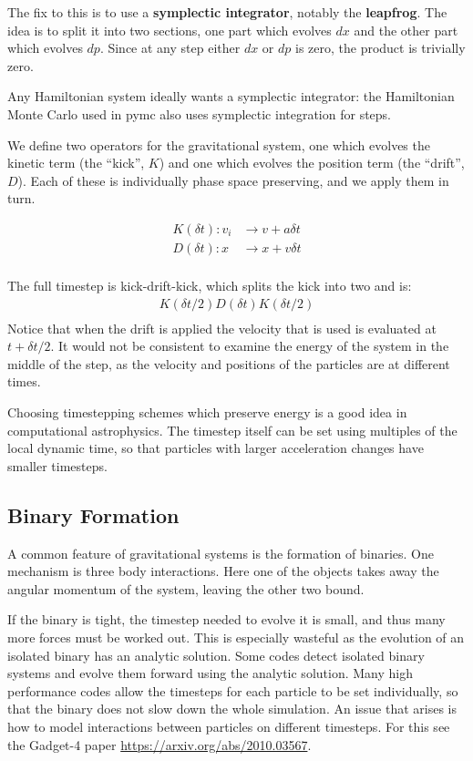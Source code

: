 \documentclass[12pt]{article}
\begin{document}
The fix to this is to use a \textbf{symplectic integrator}, notably the \textbf{leapfrog}. The idea is to split it into two sections, one part which evolves $dx$ and the other part which evolves $dp$. Since at any step either $dx$ or $dp$ is zero, the product is trivially zero.

Any Hamiltonian system ideally wants a symplectic integrator: the Hamiltonian Monte Carlo used in pymc also uses symplectic integration for steps.

We define two operators for the gravitational system, one which evolves the kinetic term (the ``kick'', $K$) and one which evolves the position term (the ``drift'', $D$). Each of these is individually phase space preserving, and we apply them in turn.

\begin{align}
 K(\delta t): v_i &\to v + a \delta t \\
 D(\delta t): x &\to x + v \delta t \\
\end{align}

The full timestep is kick-drift-kick, which splits the kick into two and is:
\begin{align}
 K(\delta t/2) D(\delta t) K(\delta t/2) \\
\end{align}
Notice that when the drift is applied the velocity that is used is evaluated at $t + \delta t /2$. It would not be consistent to examine the energy of the system in the middle of the step, as the velocity and positions of the particles are at different times.

Choosing timestepping schemes which preserve energy is a good idea in computational astrophysics. The timestep itself can be set using multiples of the local dynamic time, so that particles with larger acceleration changes have smaller timesteps.

\subsection{Binary Formation}

A common feature of gravitational systems is the formation of binaries. One mechanism is three body interactions. Here one of the objects takes away the angular momentum of the system, leaving the other two bound.

If the binary is tight, the timestep needed to evolve it is small, and thus many more forces must be worked out. This is especially wasteful as the evolution of an isolated binary has an analytic solution. Some codes detect isolated binary systems and evolve them forward using the analytic solution. Many high performance codes allow the timesteps for each particle to be set individually, so that the binary does not slow down the whole simulation. An issue that arises is how to model interactions between particles on different timesteps. For this see the Gadget-4 paper \url{https://arxiv.org/abs/2010.03567}.
\end{document}
